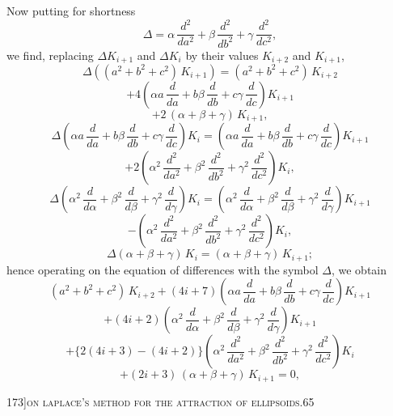 \documentclass[11pt]{article}
\begin{document}
Now putting for shortness
\[
\Delta = \alpha\,\frac{d^{2}}{da^{2}} + \beta\,\frac{d^{2}}{db^{2}} + \gamma\,\frac{d^{2}}{dc^{2}},
\]
we find, replacing $\Delta K_{i+1}$ and $\Delta K_{i}$ by their values $K_{i+2}$ and $K_{i+1}$,
\[
\Delta\left((a^{2} + b^{2} + c^{2})\,K_{i+1}\right) = (a^{2} + b^{2} + c^{2})\,K_{i+2}
\]
\[
+ 4\left(\alpha a\,\frac{d}{da} + b\beta\,\frac{d}{db} + c\gamma\,\frac{d}{dc}\right)K_{i+1}
\]
\[
+ 2\,(\alpha + \beta + \gamma)\,K_{i+1},
\]
\[
\Delta\left(\alpha a\,\frac{d}{da} + b\beta\,\frac{d}{db} + c\gamma\,\frac{d}{dc}\right)K_{i} = \left(\alpha a\,\frac{d}{da} + b\beta\,\frac{d}{db} + c\gamma\,\frac{d}{dc}\right)K_{i+1}
\]
\[
+ 2\left(\alpha^{2}\,\frac{d^{2}}{da^{2}} + \beta^{2}\,\frac{d^{2}}{db^{2}} + \gamma^{2}\,\frac{d^{2}}{dc^{2}}\right)K_{i},
\]
\[
\Delta\left(\alpha^{2}\,\frac{d}{d\alpha} + \beta^{2}\,\frac{d}{d\beta} + \gamma^{2}\,\frac{d}{d\gamma}\right)K_{i} = \left(\alpha^{2}\,\frac{d}{d\alpha} + \beta^{2}\,\frac{d}{d\beta} + \gamma^{2}\,\frac{d}{d\gamma}\right)K_{i+1}
\]
\[
- \left(\alpha^{2}\,\frac{d^{2}}{da^{2}} + \beta^{2}\,\frac{d^{2}}{db^{2}} + \gamma^{2}\,\frac{d^{2}}{dc^{2}}\right)K_{i},
\]
\[
\Delta(\alpha + \beta + \gamma)\,K_{i} = (\alpha + \beta + \gamma)\,K_{i+1};
\]
hence operating on the equation of differences with the symbol $\Delta$, we obtain
\[
(a^{2} + b^{2} + c^{2})\,K_{i+2} + (4i + 7)\left(\alpha a\,\frac{d}{da} + b\beta\,\frac{d}{db} + c\gamma\,\frac{d}{dc}\right)K_{i+1}
\]
\[
+ (4i + 2)\left(\alpha^{2}\,\frac{d}{d\alpha} + \beta^{2}\,\frac{d}{d\beta} + \gamma^{2}\,\frac{d}{d\gamma}\right)K_{i+1}
\]
\[
+ \{2(4i + 3) - (4i + 2)\}\left(\alpha^{2}\,\frac{d^{2}}{da^{2}} + \beta^{2}\,\frac{d^{2}}{db^{2}} + \gamma^{2}\,\frac{d^{2}}{dc^{2}}\right)K_{i}
\]
\[
+ (2i + 3)\,(\alpha + \beta + \gamma)\,K_{i+1} = 0,
\]

\newpage

\begin{center}
\small 173]\hfill\textsc{on laplace's method for the attraction of ellipsoids.}\hfill\textsc{65}
\end{center}

\medskip
\end{document}
